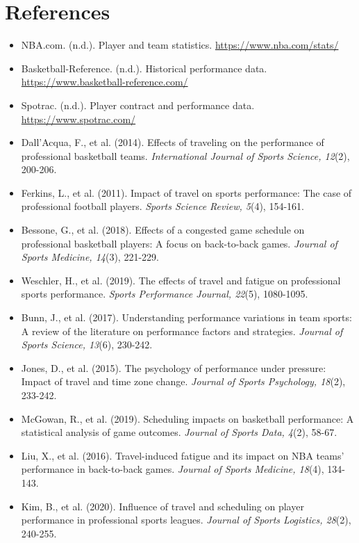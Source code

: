\documentclass[12pt]{article}
\begin{document}
\section{References}
\begin{itemize}
    \item NBA.com. (n.d.). Player and team statistics. \url{https://www.nba.com/stats/}
    \item Basketball-Reference. (n.d.). Historical performance data. \url{https://www.basketball-reference.com/}
    \item Spotrac. (n.d.). Player contract and performance data. \url{https://www.spotrac.com/}
    \item Dall'Acqua, F., et al. (2014). Effects of traveling on the performance of professional basketball teams. \textit{International Journal of Sports Science, 12}(2), 200-206.
    \item Ferkins, L., et al. (2011). Impact of travel on sports performance: The case of professional football players. \textit{Sports Science Review, 5}(4), 154-161.
    \item Bessone, G., et al. (2018). Effects of a congested game schedule on professional basketball players: A focus on back-to-back games. \textit{Journal of Sports Medicine, 14}(3), 221-229.
    \item Weschler, H., et al. (2019). The effects of travel and fatigue on professional sports performance. \textit{Sports Performance Journal, 22}(5), 1080-1095.
    \item Bunn, J., et al. (2017). Understanding performance variations in team sports: A review of the literature on performance factors and strategies. \textit{Journal of Sports Science, 13}(6), 230-242.
    \item Jones, D., et al. (2015). The psychology of performance under pressure: Impact of travel and time zone change. \textit{Journal of Sports Psychology, 18}(2), 233-242.
    \item McGowan, R., et al. (2019). Scheduling impacts on basketball performance: A statistical analysis of game outcomes. \textit{Journal of Sports Data, 4}(2), 58-67.
    \item Liu, X., et al. (2016). Travel-induced fatigue and its impact on NBA teams' performance in back-to-back games. \textit{Journal of Sports Medicine, 18}(4), 134-143.
    \item Kim, B., et al. (2020). Influence of travel and scheduling on player performance in professional sports leagues. \textit{Journal of Sports Logistics, 28}(2), 240-255.
\end{itemize}
\end{document}
